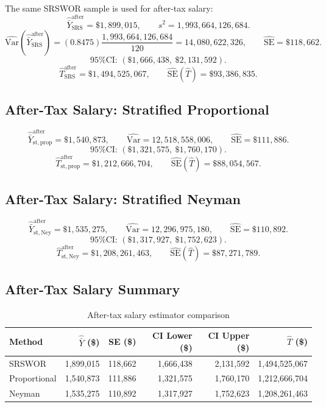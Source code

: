 \documentclass[12pt]{article}
\newcommand{\VarHat}{\widehat{\mathrm{Var}}}
\newcommand{\SEHat}{\widehat{\mathrm{SE}}}
\begin{document}
The same SRSWOR sample is used for after-tax salary:
\[
  \hat{\bar{Y}}_{\mathrm{SRS}}^{\mathrm{after}} = \$1{,}899{,}015,
  \qquad
  s^2 = 1{,}993{,}664{,}126{,}684.
\]
\[
  \VarHat\!\left(\hat{\bar{Y}}_{\mathrm{SRS}}^{\mathrm{after}}\right)
  = (0.8475)\frac{1{,}993{,}664{,}126{,}684}{120}
  = 14{,}080{,}622{,}326,
  \qquad
  \SEHat = \$118{,}662.
\]
\[
  \text{95\% CI: } (\$1{,}666{,}438,\ \$2{,}131{,}592).
\]
\[
  \hat{T}_{\mathrm{SRS}}^{\mathrm{after}} = \$1{,}494{,}525{,}067,
  \qquad
  \SEHat(\hat{T}) = \$93{,}386{,}835.
\]

\subsection{After-Tax Salary: Stratified Proportional}

\[
  \hat{\bar{Y}}_{\mathrm{st,prop}}^{\mathrm{after}} = \$1{,}540{,}873,
  \qquad
  \VarHat = 12{,}518{,}558{,}006,
  \qquad
  \SEHat = \$111{,}886.
\]
\[
  \text{95\% CI: } (\$1{,}321{,}575,\ \$1{,}760{,}170).
\]
\[
  \hat{T}_{\mathrm{st,prop}}^{\mathrm{after}} = \$1{,}212{,}666{,}704,
  \qquad
  \SEHat(\hat{T}) = \$88{,}054{,}567.
\]

\subsection{After-Tax Salary: Stratified Neyman}

\[
  \hat{\bar{Y}}_{\mathrm{st,Ney}}^{\mathrm{after}} = \$1{,}535{,}275,
  \qquad
  \VarHat = 12{,}296{,}975{,}180,
  \qquad
  \SEHat = \$110{,}892.
\]
\[
  \text{95\% CI: } (\$1{,}317{,}927,\ \$1{,}752{,}623).
\]
\[
  \hat{T}_{\mathrm{st,Ney}}^{\mathrm{after}} = \$1{,}208{,}261{,}463,
  \qquad
  \SEHat(\hat{T}) = \$87{,}271{,}789.
\]

\subsection{After-Tax Salary Summary}

\begin{table}[H]
\centering
\caption{After-tax salary estimator comparison}
\label{tab:after_compare}
\begin{tabular}{lrrrrr}
\toprule
Method & $\hat{\bar{Y}}$ (\$) & SE (\$) & CI Lower (\$) & CI Upper (\$) & $\hat{T}$ (\$) \\
\midrule
SRSWOR       & 1{,}899{,}015 & 118{,}662 & 1{,}666{,}438 & 2{,}131{,}592 & 1{,}494{,}525{,}067 \\
Proportional & 1{,}540{,}873 & 111{,}886 & 1{,}321{,}575 & 1{,}760{,}170 & 1{,}212{,}666{,}704 \\
Neyman       & 1{,}535{,}275 & 110{,}892 & 1{,}317{,}927 & 1{,}752{,}623 & 1{,}208{,}261{,}463 \\
\bottomrule
\end{tabular}
\end{table}
\end{document}
